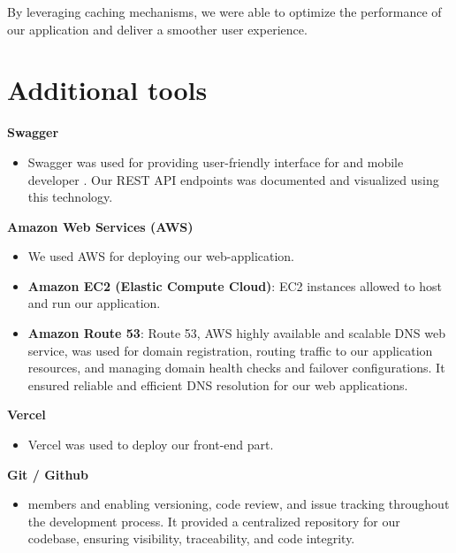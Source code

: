By leveraging caching mechanisms, we were able to optimize the performance of our application and deliver a smoother user experience.

\newpage
\section{Additional tools}\label{tools}
\textbf{Swagger \cite{swager}}

\begin{itemize}
\item Swagger \cite{swager} was used for providing user-friendly interface for  and mobile developer . Our REST API \cite{rest} endpoints was documented and visualized using this technology.
\end{itemize}

\textbf{Amazon Web Services (AWS) \cite{aws}}
\begin{itemize}
    \item  We used AWS \cite{aws} for deploying our web-application.
\end{itemize}

\begin{itemize}
\item \textbf{Amazon EC2 (Elastic Compute Cloud)}: EC2 instances allowed to host and run our application.
    
\item \textbf{Amazon Route 53}: Route 53, AWS highly available and scalable DNS web service, was used for domain registration, routing traffic to our application resources, and managing domain health checks and failover configurations. It ensured reliable and efficient DNS resolution for our web applications.
\end{itemize}

\textbf{Vercel \cite{vercel}}
\begin{itemize}
\item Vercel \cite{vercel} was used to deploy our front-end part.
\end{itemize}
\textbf{Git / Github \cite{github}}
\begin{itemize}
\item members and enabling versioning, code review, and issue tracking throughout the development process. It provided a centralized repository for our codebase, ensuring visibility, traceability, and code integrity.
\end{itemize}

